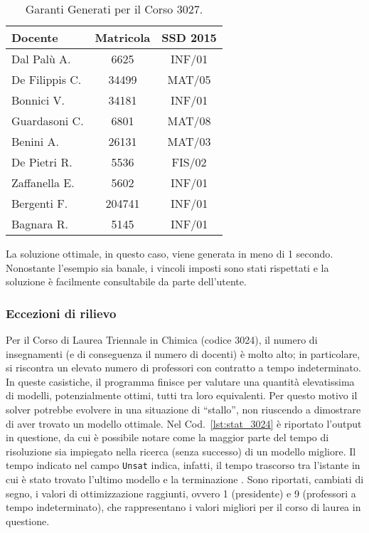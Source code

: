 \begin{table}[!ht]
    \caption{Garanti Generati per il Corso 3027.}
    \centering
    \begin{tabular}{l c c}
        \toprule
        \textbf{Docente} & \textbf{Matricola} & \textbf{SSD 2015} \\
        \midrule
        Dal Palù A. & 6625 & INF/01 \\
        De Filippis C. & 34499 & MAT/05 \\
        Bonnici V. & 34181 & INF/01 \\
        Guardasoni C. & 6801 & MAT/08 \\
        Benini A. & 26131 & MAT/03 \\
        De Pietri R. & 5536 & FIS/02 \\
        Zaffanella E. & 5602 & INF/01 \\
        Bergenti F. & 204741 & INF/01 \\
        Bagnara R. & 5145 & INF/01 \\
        \bottomrule
    \end{tabular}
    \label{tab:garanti}
\end{table}

La soluzione ottimale, in questo caso, viene generata in meno di 1 secondo. 
Nonostante l'esempio sia banale, i vincoli imposti sono stati rispettati 
e la soluzione è facilmente consultabile da parte dell'utente.

\subsubsection*{Eccezioni di rilievo} Per il Corso di Laurea Triennale in Chimica (codice 3024), 
il numero di insegnamenti (e di conseguenza il numero di docenti) è molto 
alto; in particolare, si riscontra un elevato numero di professori con contratto
a tempo indeterminato. In queste casistiche, il programma finisce per valutare una quantità elevatissima 
di modelli, potenzialmente ottimi, tutti tra loro equivalenti. Per questo 
motivo il solver potrebbe evolvere in una situazione di ``stallo'', non 
riuscendo a dimostrare di aver trovato un modello ottimale. Nel Cod.~\ref{lst:stat_3024} è riportato l'output in questione, da cui è 
possibile notare come la maggior parte del tempo di risoluzione sia impiegato nella 
ricerca (senza successo) di un modello migliore. Il tempo indicato nel campo \texttt{Unsat} indica, infatti, il tempo trascorso tra 
l'istante in cui è stato trovato l'ultimo modello e la terminazione \cite{gebser2015potassco}.
Sono riportati, cambiati di segno, i valori di ottimizzazione raggiunti, ovvero 1 (presidente) e 
9 (professori a tempo indeterminato), che rappresentano i valori migliori per il corso di laurea in questione. 

